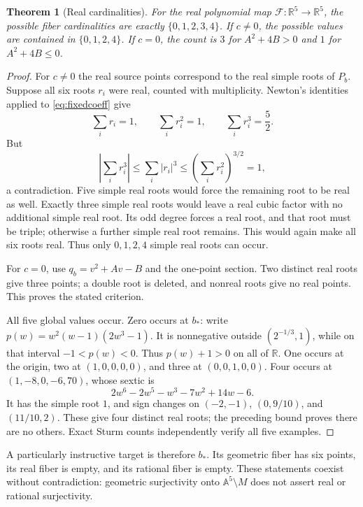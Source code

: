\documentclass[11pt,a4paper]{article}
\newtheorem{theorem}{Theorem}[section]
\theoremstyle{definition}
\newcommand{\A}{\mathbb A}
\newcommand{\R}{\mathbb R}
\newcommand{\F}{\mathcal F}
\begin{document}
\begin{theorem}[Real cardinalities]\label{thm:real}
For the real polynomial map $\F:\R^5\to\R^5$, the possible fiber
cardinalities are exactly $\{0,1,2,3,4\}$. If $c\ne0$, the possible
values are contained in $\{0,1,2,4\}$. If $c=0$, the count is $3$ for
$A^2+4B>0$ and $1$ for $A^2+4B\le0$.
\end{theorem}
\begin{proof}
For $c\ne0$ the real source points correspond to the real simple roots
of $P_b$. Suppose all six roots $r_i$ were real, counted with
multiplicity. Newton's identities applied to \eqref{eq:fixedcoeff} give
\[
 \sum_i r_i=1,\qquad \sum_i r_i^2=1,\qquad
 \sum_i r_i^3=\frac52.
\]
But
\[
 \left|\sum_i r_i^3\right|\le\sum_i|r_i|^3
 \le\left(\sum_i r_i^2\right)^{3/2}=1,
\]
a contradiction. Five simple real roots would force the remaining root
to be real as well. Exactly three simple real roots would leave a
real cubic factor with no additional simple real root. Its odd degree
forces a real root, and that root must be triple; otherwise a further
simple real root remains. This would again make all six roots real.
Thus only $0,1,2,4$ simple real roots can occur.

For $c=0$, use $q_b=v^2+Av-B$ and the one-point section. Two distinct
real roots give three points; a double root is deleted, and nonreal
roots give no real points. This proves the stated criterion.

All five global values occur. Zero occurs at $b_*$: write
$p(w)=w^2(w-1)(2w^3-1)$. It is nonnegative outside
$(2^{-1/3},1)$, while on that interval $-1<p(w)<0$. Thus $p(w)+1>0$
on all of $\R$. One occurs at the origin, two at $(1,0,0,0,0)$, and
three at $(0,0,1,0,0)$. Four occurs at $(1,-8,0,-6,70)$, whose sextic is
\[
 2w^6-2w^5-w^3-7w^2+14w-6.
\]
It has the simple root $1$, and sign changes on
$(-2,-1)$, $(0,9/10)$, and $(11/10,2)$. These give four distinct real
roots; the preceding bound proves there are no others. Exact Sturm
counts independently verify all five examples.
\end{proof}

A particularly instructive target is therefore $b_*$. Its geometric
fiber has six points, its real fiber is empty, and its rational fiber is
empty. These statements coexist without contradiction: geometric
surjectivity onto $\A^5\setminus M$ does not assert real or rational
surjectivity.

\end{document}
